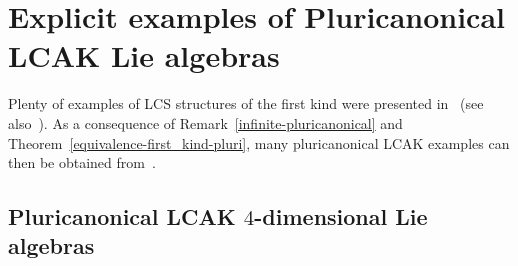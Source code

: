 \documentclass[a4paper,11pt]{amsart}
\theoremstyle{definition}
\renewcommand{\[}{\begin{equation*}}
\renewcommand{\]}{\end{equation*}}
\begin{document}






\section{Explicit examples of Pluricanonical LCAK Lie algebras}\label{Sec3}
Plenty of examples of LCS structures of the first kind were presented in~\cite{MR3767426} (see also~\cite{MR3763412}). As a consequence of Remark~\ref{infinite-pluricanonical} and Theorem~\ref{equivalence-first_kind-pluri}, many pluricanonical LCAK examples can then be obtained from~\cite{MR3767426}.
\subsection{Pluricanonical LCAK $4$-dimensional Lie algebras}\label{LCAKdimension 4}
\end{document}
